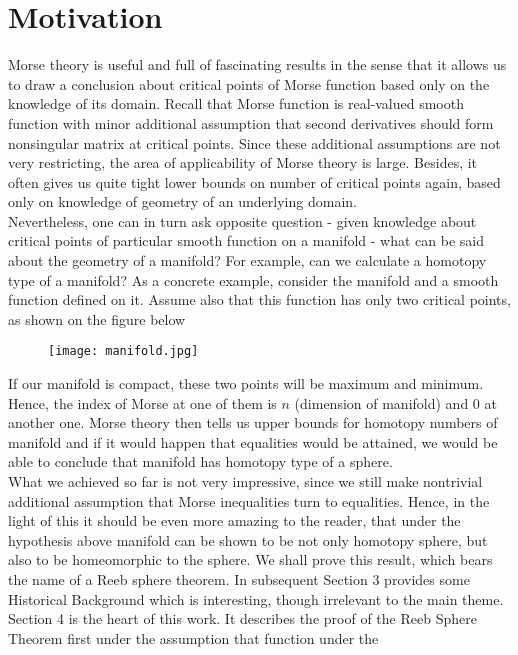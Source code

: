 \documentclass[8pt]{article} %
\begin{document}
\section{Motivation}
Morse theory is useful and full of fascinating results in the sense that it allows us to draw a conclusion about critical points of Morse function based only on the knowledge of its domain.
Recall that Morse function is real-valued smooth function with minor additional assumption that second derivatives should form nonsingular matrix at critical points. Since these additional assumptions are not very restricting,
the area of applicability of Morse theory is large. Besides, it often gives us quite tight lower bounds on number of critical points again, based only on knowledge of geometry of an underlying domain.\\
Nevertheless, one can in turn ask opposite question - given knowledge about critical points of particular smooth function on a manifold - what can be said about the geometry of a manifold? For example, can we calculate a homotopy type
of a manifold? As a concrete example, consider the manifold and a smooth function defined on it. Assume also that this function has only two critical points, as shown on the figure below\\
\begin{figure}[H]
\centering
\texttt{[image: manifold.jpg]}
\caption{}
\end{figure}
If our manifold is compact, these two points will be maximum and minimum.
Hence, the index of Morse at one of them is $n$ (dimension of manifold) and $0$ at another one. Morse theory then tells us upper bounds for homotopy numbers of manifold and if it would happen that equalities would be attained, we would
be able to conclude that manifold has homotopy type of a sphere.\\
What we achieved so far is not very impressive, since we still make nontrivial additional assumption that Morse inequalities turn to equalities. Hence, in the light of this it should be even more amazing to the reader, that under the
hypothesis above manifold can be shown to be not only homotopy sphere, but also to be homeomorphic to the sphere. We shall prove this result, which bears the name of a Reeb sphere theorem.
In subsequent Section 3 provides some Historical Background which is interesting, though irrelevant to the main theme.\\
Section 4 is the heart of this work. It describes the proof of the Reeb Sphere Theorem first under the assumption that function under the 
\end{document}

